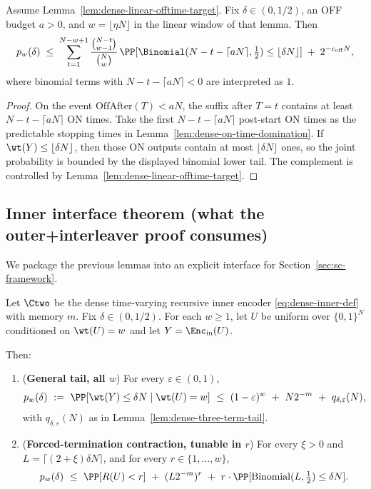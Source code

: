\begin{corollary}
\label{cor:dense-first-start-offbudget-target}
Assume Lemma~\ref{lem:dense-linear-offtime-target}. Fix \(\delta\in(0,1/2)\), an OFF budget \(a>0\), and
\(w=\lfloor\eta N\rfloor\) in the linear window of that lemma. Then
\[
p_w(\delta)
\;\le\;
\sum_{t=1}^{N-w+1}
\frac{\binom{N-t}{w-1}}{\binom{N}{w}}\,
\PP[\Binomial(N-t-\lceil aN\rceil,\tfrac12)\le \lfloor\delta N\rfloor]
\;+\;
2^{-c_{\mathrm{off}}N},
\]
where binomial terms with \(N-t-\lceil aN\rceil<0\) are interpreted as \(1\).
\end{corollary}

\begin{proof}
On the event \(\mathrm{OffAfter}(T)<aN\), the suffix after \(T=t\) contains at least \(N-t-\lceil aN\rceil\) ON times. Take
the first \(N-t-\lceil aN\rceil\) post-start ON times as the predictable stopping times in
Lemma~\ref{lem:dense-on-time-domination}. If \(\wt(Y)\le \lfloor\delta N\rfloor\), then those ON outputs contain at
most \(\lfloor\delta N\rfloor\) ones, so the joint probability is bounded by the displayed binomial lower tail. The
complement is controlled by Lemma~\ref{lem:dense-linear-offtime-target}.
\end{proof}

\subsection{Inner interface theorem (what the outer+interleaver proof consumes)}
\label{subsec:inner-dense-interface}

We package the previous lemmas into an explicit interface for Section~\ref{sec:sc-framework}.

\begin{theorem}
\label{thm:inner-dense-interface}
Let $\Ctwo$ be the dense time-varying recursive inner encoder \eqref{eq:dense-inner-def} with memory $m$.
Fix $\delta\in(0,1/2)$.
For each $w\ge 1$, let $U$ be uniform over $\{0,1\}^N$ conditioned on $\wt(U)=w$ and let $Y=\Enc_{\mathrm{in}}(U)$.

Then:
\begin{enumerate}
\item (\textbf{General tail, all $w$}) For every $\varepsilon\in(0,1)$,
\[
p_w(\delta)\ :=\ \PP[\wt(Y)\le \delta N\mid \wt(U)=w]
\ \le\
(1-\varepsilon)^w\ +\ N2^{-m}\ +\ q_{\delta,\varepsilon}(N),
\]
with $q_{\delta,\varepsilon}(N)$ as in Lemma~\ref{lem:dense-three-term-tail}.
\item (\textbf{Forced-termination contraction, tunable in $r$}) For every $\xi>0$ and
$L=\lceil(2+\xi)\delta N\rceil$, and for every $r\in\{1,\dots,w\}$,
\[
p_w(\delta)
\ \le\
\PP[R(U)<r]\ +\ (L2^{-m})^{r}\ +\ r\cdot \PP[\mathrm{Binomial}(L,\tfrac12)\le \delta N].
\]
\end{enumerate}
\end{theorem}

